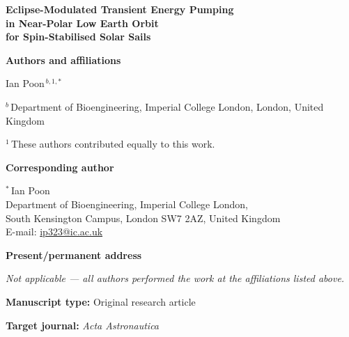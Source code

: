 \documentclass[11pt,a4paper]{article}
\begin{document}
\thispagestyle{empty}

\begin{center}
{\Large\bfseries Eclipse-Modulated Transient Energy Pumping\\[0.2em]
in Near-Polar Low Earth Orbit\\[0.2em]
for Spin-Stabilised Solar Sails\par}
\end{center}

\vspace{1.5em}

\textbf{Authors and affiliations}

 Ian Poon$^{\,b,1,\ast}$

\vspace{0.5em}

$^{b}$\,Department of Bioengineering, Imperial College London, London, United Kingdom\\

\vspace{0.5em}

$^{1}$\,These authors contributed equally to this work.

\vspace{1em}

\textbf{Corresponding author}

$^{\ast}$\,Ian Poon\\
Department of Bioengineering, Imperial College London,\\
South Kensington Campus, London SW7 2AZ, United Kingdom\\
E-mail: \href{mailto:ip323@ic.ac.uk}{ip323@ic.ac.uk}

\vspace{1em}

\textbf{Present/permanent address}

\textit{Not applicable --- all authors performed the work at the affiliations listed above.}

\vspace{1em}

\textbf{Manuscript type:} Original research article

\textbf{Target journal:} \textit{Acta Astronautica}
\end{document}
